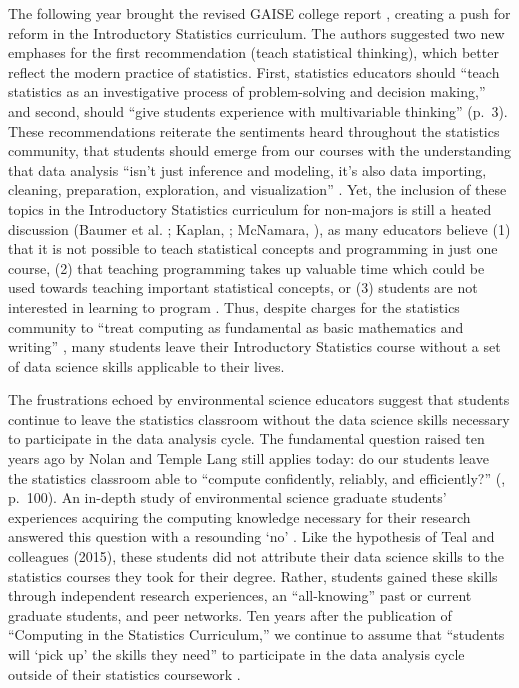 \documentclass[12pt]{article}
\begin{document}
\quad The following year brought the revised GAISE college report 
\citep{gaise}, creating a push for reform in the Introductory Statistics 
curriculum. The authors suggested two new emphases for the first recommendation
(teach statistical thinking), which better reflect the modern practice of
statistics. First, statistics educators should ``teach statistics as
an investigative process of problem-solving and decision making,'' and second,
should ``give students experience with multivariable thinking'' 
(p.\ 3). These recommendations reiterate the sentiments heard
throughout the statistics community, that students should emerge from our
courses with the understanding that data analysis ``isn't just inference and
modeling, it's also data importing, cleaning, preparation, exploration, and
visualization'' \citep{mine-jsm}. Yet, the inclusion of these topics in the
Introductory Statistics curriculum for non-majors is still a heated
discussion (Baumer et al. \citeyear{horton_takingachance}; Kaplan, 
\citeyear{kaplan}; McNamara, \citeyear{mcnamara}), as many educators believe
(1) that it is not possible to teach statistical concepts and programming in
just one course, (2) that teaching programming takes up valuable time which
could be used towards teaching important statistical concepts, or (3) students
are not interested in learning to program \citep{mine-jsm}. Thus, despite
charges for the statistics community to ``treat computing as fundamental as
basic mathematics and writing'' \citep[p.\ 298]{esr}, many students leave their
Introductory Statistics course without a set of data science skills applicable
to their lives. 

\quad The frustrations echoed by environmental science educators 
\citep{hampton, carpentry} suggest that students continue to leave the 
statistics classroom without the data science skills necessary to participate in 
the data analysis cycle. The fundamental question raised 
ten years ago by Nolan and Temple Lang still applies today: do our students
leave the statistics classroom able to ``compute confidently, reliably, and
efficiently?'' (\citeyear{nolan}, p.\ 100). An in-depth study of environmental 
science graduate students' experiences acquiring the computing knowledge
necessary for their research answered this question with a resounding `no' 
\citep{theobold}. Like the hypothesis of Teal and colleagues (2015), these
students did not attribute their data science skills to the statistics courses
they took for their degree. Rather, students gained these skills through
independent research experiences, an ``all-knowing'' past or current graduate
students, and peer networks. Ten years after the publication of ``Computing in
the Statistics Curriculum,'' we continue to assume that ``students will `pick
up' the skills they need'' to participate in the data analysis cycle outside of
their statistics coursework \citep[p.\ 309]{gould}. 
\end{document}
